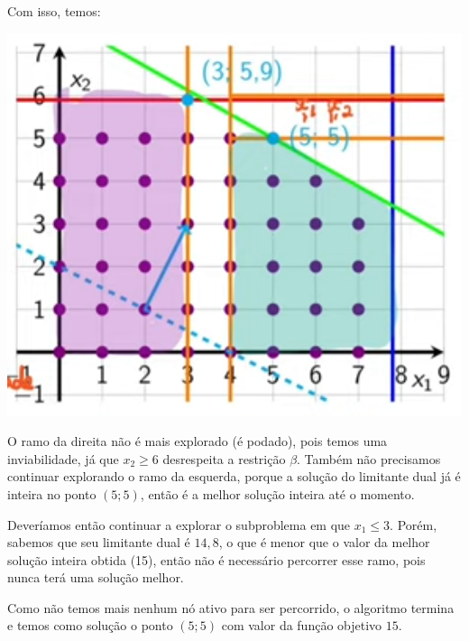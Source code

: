 Com isso, temos:

\begin{multicols}{2}

    \null\vfill
    \begin{center}
    \end{center}
    \vfill\null

    \columnbreak

    \includegraphics[width=.45\textwidth]{img/ex_branch_bound_3.png}
\end{multicols}

O ramo da direita não é mais explorado (é podado), pois temos uma inviabilidade, já que $x_2\geq6$ desrespeita a restrição $\beta$. Também não precisamos continuar explorando o ramo da esquerda, porque a solução do limitante dual já é inteira no ponto $(5; 5)$, então é a melhor solução inteira até o momento.

Deveríamos então continuar a explorar o subproblema em que $x_1\leq3$. Porém, sabemos que seu limitante dual é $14,8$, o que é menor que o valor da melhor solução inteira obtida (15), então não é necessário percorrer esse ramo, pois nunca terá uma solução melhor.

Como não temos mais nenhum nó ativo para ser percorrido, o algoritmo termina e temos como solução o ponto $(5; 5)$ com valor da função objetivo $15$.

